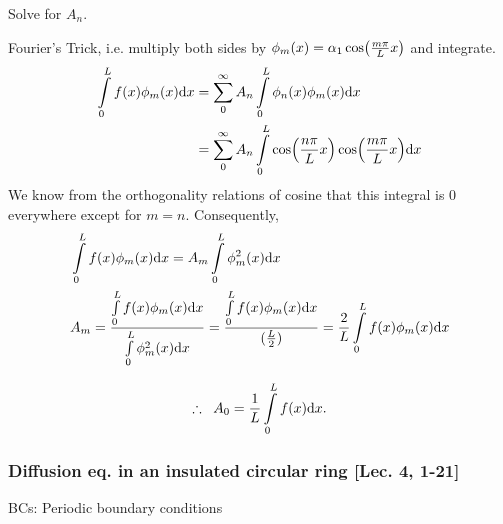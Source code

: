 \begin{quest}
	\item Solve for $A_n$.
	\begin{ans}
		Fourier's Trick, i.e. multiply both sides by $\phi_m(x) = \alpha_1 \cos(\frac{m\pi}{L} x)$ and integrate. 
		\[\begin{aligned}
			\int\limits_0^L f(x) \phi_m(x) \text{d} x
				&= \sum\limits_0^\infty A_n \int\limits_0^L \phi_n(x) \phi_m(x) \text{d} x \\
				&= \sum\limits_0^\infty A_n \int\limits_0^L \cos(\frac{n\pi}{L} x) \cos(\frac{m\pi}{L} x) \text{d} x
		\end{aligned}\]
		We know from the orthogonality relations of cosine that this integral is 0 everywhere except for $m = n$. Consequently, 
		\[\begin{aligned}
			&\int\limits_0^L f(x) \phi_m(x) \text{d} x = A_m \int\limits_0^L \phi^2_m(x) \text{d} x \\
			& A_m = 
				\frac{ \int\limits_0^L f(x) \phi_m(x) \text{d} x }{ \int\limits_0^L \phi^2_m(x) \text{d} x } = \frac{ \int\limits_0^L f(x) \phi_m(x) \text{d} x}{ (\frac{L}{2})  }
				= \frac{2}{L} \int\limits_0^L f(x) \phi_m(x) \text{d} x \\
		\end{aligned}\]
	\end{ans}

	\item 
\end{quest}
\begin{equation} 
	\therefore \;\; A_0 = \frac{1}{L} \int\limits_0^L f(x) \text{d} x .
\end{equation}


\subsubsection*{Diffusion eq. in an insulated circular ring [Lec. 4, 1-21]}


BCs: Periodic boundary conditions
